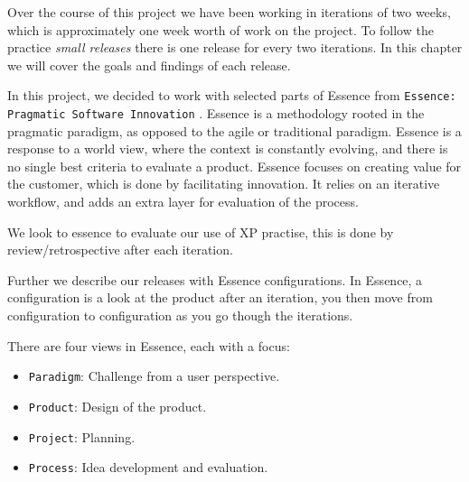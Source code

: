 Over the course of this project we have been working in iterations of two weeks, which is approximately one week worth of work on the project. To follow the practice \textit{small releases} there is one release for every two iterations. In this chapter we will cover the goals and findings of each release.

In this project, we decided to work with selected parts of Essence from \texttt{Essence: Pragmatic Software Innovation} \citep{essence:config}. Essence is a methodology rooted in the pragmatic paradigm, as opposed to the agile or traditional paradigm. Essence is a response to a world view, where the context is constantly evolving, and there is no single best criteria to evaluate a product. Essence focuses on creating value for the customer, which is done by facilitating innovation. It relies on an iterative workflow, and adds an extra layer for evaluation of the process.

We look to essence to evaluate our use of XP practise, this is done by review/retrospective after each iteration.

Further we describe our releases with Essence configurations. In Essence, a configuration is a look at the product after an iteration, you then move from configuration to configuration as you go though the iterations. 

There are four views in Essence, each with a focus: 
\begin{itemize}
\item \texttt{Paradigm}: Challenge from a user perspective.
\item \texttt{Product}: Design of the product.
\item \texttt{Project}: Planning.
\item \texttt{Process}: Idea development and evaluation.
\end{itemize}



